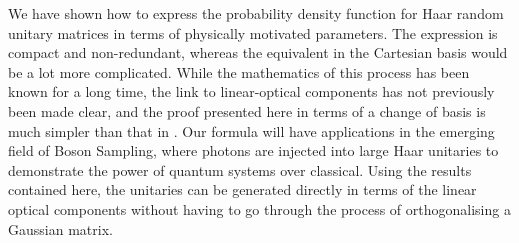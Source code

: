 \documentclass[aps,prl,twocolumn]{revtex4}
\begin{document}
We have shown how to express the probability density function for Haar random
unitary matrices in terms of physically motivated parameters. The expression is
compact and non-redundant, whereas the equivalent in the Cartesian basis would
be a lot more complicated. While the mathematics of this process has been known
for a long time, the link to linear-optical components has not previously been
made clear, and the proof presented here in terms of a change of basis is much
simpler than that in \cite{sp-jpa-43-385306}. Our formula will have
applications in the emerging field of Boson Sampling, where photons are
injected into large Haar unitaries to demonstrate the power of quantum systems
over classical. Using the results contained here, the unitaries can be
generated directly in terms of the linear optical components without having to
go through the process of orthogonalising a Gaussian matrix.


\end{document}
